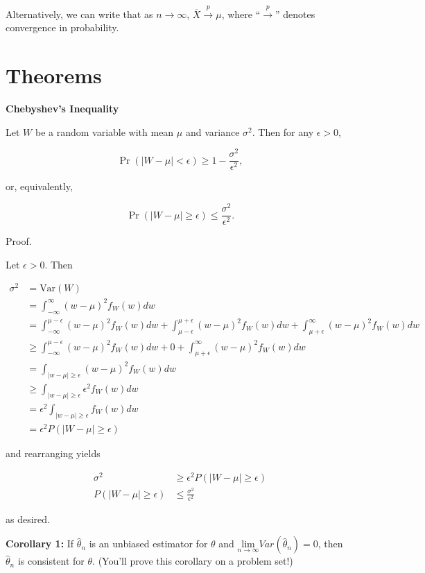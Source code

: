 \documentclass[
  letterpaper,
  DIV=11,
  numbers=noendperiod]{scrreprt}
\begin{document}
Alternatively, we can write that as \(n \to \infty\),
\(\overline{X} \overset{p}{\to} \mu\), where ``\(\overset{p}{\to}\)''
denotes convergence in probability.

\section{Theorems}\label{theorems-4}

\textbf{Chebyshev's Inequality}

Let \(W\) be a random variable with mean \(\mu\) and variance
\(\sigma^2\). Then for any \(\epsilon > 0\),

\[
\Pr(|W - \mu| < \epsilon) \geq 1 - \frac{\sigma^2}{\epsilon^2},
\]

or, equivalently,

\[
\Pr(|W - \mu| \geq \epsilon) \leq \frac{\sigma^2}{\epsilon^2}.
\]

Proof.

Let \(\epsilon > 0\). Then

\begin{align*}
\sigma^2 & = \text{Var}(W) \\
& = \int_{-\infty}^\infty (w-\mu)^2 f_W(w)dw \\
& = \int_{-\infty}^{\mu - \epsilon} (w-\mu)^2 f_W(w)dw + \int_{\mu - \epsilon}^{\mu + \epsilon} (w-\mu)^2 f_W(w)dw + \int_{\mu + \epsilon}^\infty (w-\mu)^2 f_W(w)dw \\
& \ge \int_{-\infty}^{\mu - \epsilon} (w-\mu)^2 f_W(w)dw + 0  + \int_{\mu + \epsilon}^\infty (w-\mu)^2 f_W(w)dw \\
&= \int_{|w-\mu|\ge \epsilon} (w-\mu)^2 f_W(w)dw \\
& \ge \int_{|w-\mu|\ge \epsilon} \epsilon^2 f_W(w)dw \\
& = \epsilon^2 \int_{|w-\mu|\ge \epsilon} f_W(w)dw\\
& = \epsilon^2 P(|W-\mu| \ge \epsilon)
\end{align*}

and rearranging yields

\begin{align*}
\sigma^2 & \geq \epsilon^2 P(|W-\mu| \ge \epsilon) \\
P(|W-\mu| \geq \epsilon) & \leq \frac{\sigma^2}{\epsilon^2}
\end{align*}

as desired.

\textbf{Corollary 1:} If \(\hat{\theta}_n\) is an unbiased estimator for
\(\theta\) and
\(\underset{n \to \infty}{\text{lim}} Var(\hat{\theta}_n) = 0\), then
\(\hat{\theta}_n\) is consistent for \(\theta\). (You'll prove this
corollary on a problem set!)
\end{document}
